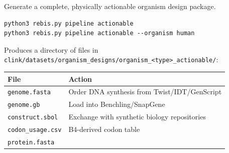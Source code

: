 \documentclass[12pt,a4paper]{article}
\begin{document}
Generate a complete, physically actionable organism design package.

\begin{verbatim}
python3 rebis.py pipeline actionable
python3 rebis.py pipeline actionable --organism human
\end{verbatim}

Produces a directory of files in
\texttt{clink/datasets/organism\_designs/organism\_\textless{}type\textgreater{}\_actionable/}:

\begin{longtable}[]{@{}ll@{}}
\toprule
\begin{minipage}[b]{0.40\columnwidth}\raggedright
File\strut
\end{minipage} & \begin{minipage}[b]{0.54\columnwidth}\raggedright
Action\strut
\end{minipage}\tabularnewline
\midrule
\endhead
\begin{minipage}[t]{0.40\columnwidth}\raggedright
\texttt{genome.fasta}\strut
\end{minipage} & \begin{minipage}[t]{0.54\columnwidth}\raggedright
Order DNA synthesis from Twist/IDT/GenScript\strut
\end{minipage}\tabularnewline
\begin{minipage}[t]{0.40\columnwidth}\raggedright
\texttt{genome.gb}\strut
\end{minipage} & \begin{minipage}[t]{0.54\columnwidth}\raggedright
Load into Benchling/SnapGene\strut
\end{minipage}\tabularnewline
\begin{minipage}[t]{0.40\columnwidth}\raggedright
\texttt{construct.sbol}\strut
\end{minipage} & \begin{minipage}[t]{0.54\columnwidth}\raggedright
Exchange with synthetic biology repositories\strut
\end{minipage}\tabularnewline
\begin{minipage}[t]{0.40\columnwidth}\raggedright
\texttt{codon\_usage.csv}\strut
\end{minipage} & \begin{minipage}[t]{0.54\columnwidth}\raggedright
B4-derived codon table\strut
\end{minipage}\tabularnewline
\begin{minipage}[t]{0.40\columnwidth}\raggedright
\texttt{protein.fasta}\strut
\end{minipage} & \begin{minipage}[t]{0.54\columnwidth}\raggedright

\end{minipage}
\end{longtable}
\end{document}
